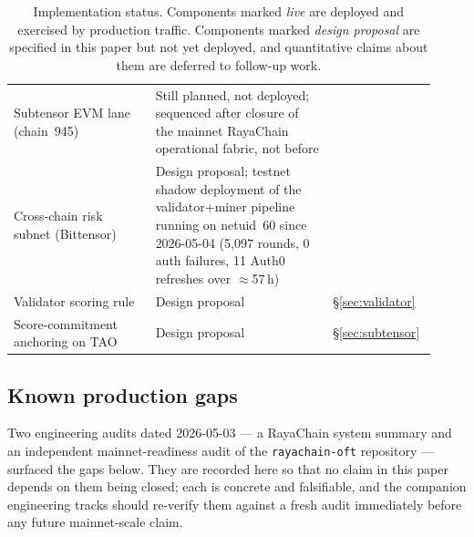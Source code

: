 \documentclass[11pt,a4paper]{article}
\begin{document}
\begin{table}[h]
\begin{tabular}{p{0.32\linewidth}p{0.40\linewidth}p{0.20\linewidth}}
Subtensor EVM lane (chain~945)
  & Still planned, not deployed; sequenced after closure of the mainnet
    RayaChain operational fabric, not before
  & \cite{opentensor2024evm} \\
Cross-chain risk subnet (Bittensor)
  & Design proposal; testnet shadow deployment of the validator+miner
    pipeline running on netuid~60 since 2026-05-04 (5{,}097 rounds, 0 auth
    failures, 11 Auth0 refreshes over $\approx$57\,h)
  & \cite{omnirisk2026soak} \\
Validator scoring rule
  & Design proposal
  & \S\ref{sec:validator} \\
Score-commitment anchoring on TAO
  & Design proposal
  & \S\ref{sec:subtensor} \\
\bottomrule
\end{tabular}
\caption{Implementation status. Components marked \emph{live} are deployed and
exercised by production traffic. Components marked \emph{design proposal} are
specified in this paper but not yet deployed, and quantitative claims about
them are deferred to follow-up work.}
\label{tab:status}
\end{table}

\subsection{Known production gaps}\label{sec:status:gaps}

Two engineering audits dated 2026-05-03 --- a RayaChain system summary and an
independent mainnet-readiness audit of the \texttt{rayachain-oft} repository ---
surfaced the gaps below. They are recorded here so that no claim in this paper
depends on them being closed; each is concrete and falsifiable, and the
companion engineering tracks should re-verify them against a fresh audit
immediately before any future mainnet-scale claim.
\end{document}
